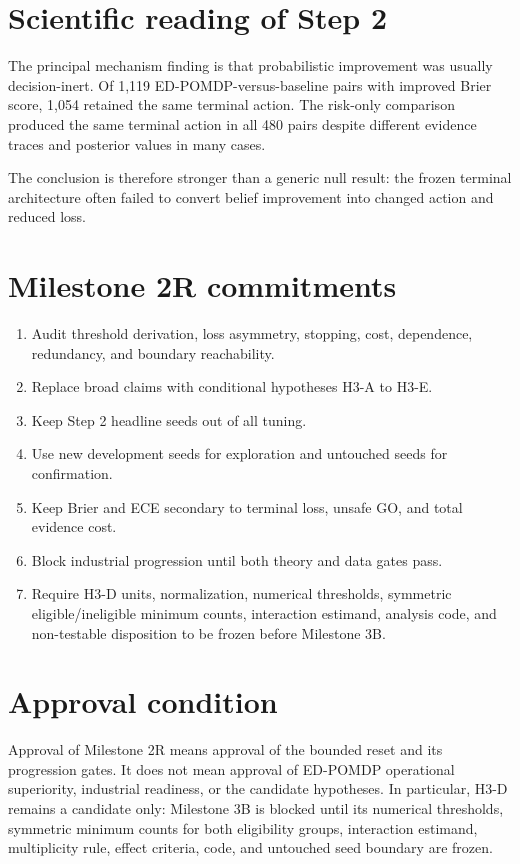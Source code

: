 \documentclass[11pt,a4paper]{article}
\begin{document}
\section*{Scientific reading of Step 2}

The principal mechanism finding is that probabilistic improvement was usually decision-inert. Of 1,119 ED-POMDP-versus-baseline pairs with improved Brier score, 1,054 retained the same terminal action. The risk-only comparison produced the same terminal action in all 480 pairs despite different evidence traces and posterior values in many cases.

The conclusion is therefore stronger than a generic null result: the frozen terminal architecture often failed to convert belief improvement into changed action and reduced loss.

\section*{Milestone 2R commitments}

\begin{enumerate}
  \item Audit threshold derivation, loss asymmetry, stopping, cost, dependence, redundancy, and boundary reachability.
  \item Replace broad claims with conditional hypotheses H3-A to H3-E.
  \item Keep Step 2 headline seeds out of all tuning.
  \item Use new development seeds for exploration and untouched seeds for confirmation.
  \item Keep Brier and ECE secondary to terminal loss, unsafe GO, and total evidence cost.
  \item Block industrial progression until both theory and data gates pass.
  \item Require H3-D units, normalization, numerical thresholds, symmetric eligible/ineligible minimum counts, interaction estimand, analysis code, and non-testable disposition to be frozen before Milestone 3B.
\end{enumerate}

\section*{Approval condition}

Approval of Milestone 2R means approval of the bounded reset and its progression gates. It does not mean approval of ED-POMDP operational superiority, industrial readiness, or the candidate hypotheses. In particular, H3-D remains a candidate only: Milestone 3B is blocked until its numerical thresholds, symmetric minimum counts for both eligibility groups, interaction estimand, multiplicity rule, effect criteria, code, and untouched seed boundary are frozen.
\end{document}
